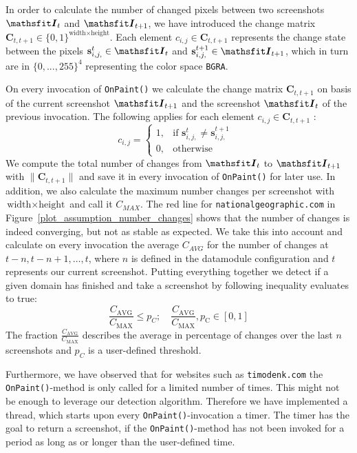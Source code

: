 In order to calculate the number of changed pixels between two screenshots $\tens{I}_{t}$ and $\tens{I}_{t+1}$, we have introduced the change matrix $\bm{C}_{t,t+1} \in \{0,1\}^{\text{width}\times \text{height}}$. Each element $c_{i,j} \in \bm{C}_{t,t+1}$ represents the change state between the pixels $\mathbf{s}^{t}_{i,j,} \in \tens{I}_{t}$ and $\mathbf{s}^{t+1}_{i,j,}  \in \tens{I}_{t+1}$, which in turn are in $\{0, ... , 255\}^{4}$ representing the color space \texttt{BGRA}.

On every invocation of \texttt{OnPaint()} we calculate the change matrix $\bm{C}_{t,t+1}$ on basis of the current screenshot $\tens{I}_{t+1}$ and the screenshot $\tens{I}_{t}$ of the previous invocation. The following applies for each element $c_{i,j} \in \bm{C}_{t,t+1}$ :
\begin{equation}
c_{i,j} =
\begin{cases}
1,& \text{if $\mathbf{s}^{t}_{i,j,} \neq \mathbf{s}^{t+1}_{i,j,}$ } \\
0,              & \text{otherwise}
\end{cases}
\end{equation}
We compute the total number of changes from $\tens{I}_{t}$ to $\tens{I}_{t+1}$ with $\lVert\bm{C}_{t,t+1}\rVert$ and save it in every invocation of \texttt{OnPaint()} for later use. In addition, we also calculate the maximum number changes per screenshot with $\text{width} \times \text{height}$ and call it $C_{MAX}$. The red line for \texttt{nationalgeographic.com} in Figure~\ref{plot_assumption_number_changes} shows that the number of changes is indeed converging, but not as stable as expected. We take this into account and calculate on every invocation the average $C_{AVG}$ for the number of changes at $t-n, t-n+1, \dots, t$, where $n$ is defined in the datamodule configuration and $t$ represents our current screenshot. Putting everything together we detect if a given domain has finished and take a screenshot by following inequality evaluates to true:
\begin{equation}
{\frac{C_{\text{AVG}}}{C_{\text{MAX}}} \leq p_{C}; \quad   {\frac{C_{\text{AVG}}}{C_{\text{MAX}}}}, p_{\text{C}} \in [0,1]}
\end{equation}
The fraction ${\frac{C_{\text{AVG}}}{C_{\text{MAX}}}}$ describes the average in percentage of changes over the last $n$ screenshots and $p_{C}$ is a user-defined threshold. 

Furthermore, we have observed that for websites such as \texttt{timodenk.com} the \texttt{OnPaint()}-method is only called for a limited number of times. This might not be enough to leverage our detection algorithm. Therefore we have implemented a thread, which starts upon every \texttt{OnPaint()}-invocation a timer. The timer has the goal to return a screenshot, if the \texttt{OnPaint()}-method has not been invoked for a period as long as or longer than the user-defined time.  

